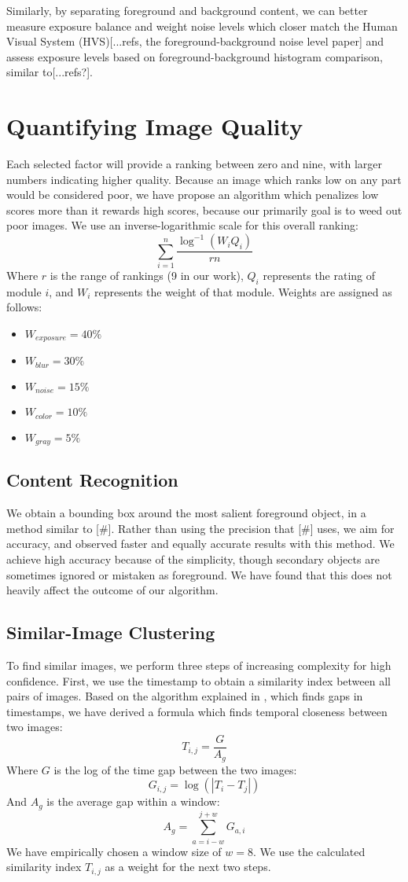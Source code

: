 \documentclass[twocolumn]{article}
\begin{document}
Similarly, by separating foreground and background content, we can better measure exposure balance and weight noise levels which closer match the Human Visual System (HVS)[...refs, the foreground-background noise level paper] and assess exposure levels based on foreground-background histogram comparison, similar to[...refs?].

\section{Quantifying Image Quality}
Each selected factor will provide a ranking between zero and nine, with larger numbers indicating higher quality. Because an image which ranks low on any part would be considered poor, we have propose an algorithm which penalizes low scores more than it rewards high scores, because our primarily goal is to weed out poor images. We use an inverse-logarithmic scale for this overall ranking:
\[
\displaystyle\sum\limits_{i=1}^n\frac{\log^{-1}(W_iQ_i)}{rn}
\]
Where \(r\) is the range of rankings (9 in our work), \(Q_i\) represents the rating of module \(i\), and \(W_i\) represents the weight of that module. Weights are assigned as follows:
\begin{itemize}
\item \(W_{exposure}=40\%\)
\item \(W_{blur}=30\%\)
\item \(W_{noise}=15\%\)
\item \(W_{color}=10\%\)
\item \(W_{gray}=5\%\)
\end{itemize}

\subsection{Content Recognition}
We obtain a bounding box around the most salient foreground object, in a method similar to [\#]. Rather than using the precision that [\#] uses, we aim for accuracy, and observed faster and equally accurate results with this method. We achieve high accuracy because of the simplicity, though secondary objects are sometimes ignored or mistaken as foreground. We have found that this does not heavily affect the outcome of our algorithm.

\subsection{Similar-Image Clustering}
To find similar images, we perform three steps of increasing complexity for high confidence.
First, we use the timestamp to obtain a similarity index between all pairs of images. Based on the algorithm explained in \cite{1292402}, which finds gaps in timestamps, we have derived a formula which finds temporal closeness between two images:
\[
T_{i,j}=\frac{G}{A_g}
\]
Where \(G\) is the log of the time gap between the two images:
\[
G_{i,j}=\log(|T_i-T_j|)
\]
And \(A_g\) is the average gap within a window:
\[
A_g=\displaystyle\sum\limits_{a={i-w}}^{j+w}G_{a,i}
\]
We have empirically chosen a window size of \(w=8\).
We use the calculated similarity index \(T_{i,j}\) as a weight for the next two steps.
\end{document}
